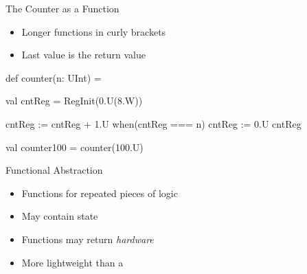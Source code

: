 \begin{frame}[fragile]{The Counter as a Function}
\begin{itemize}
\item Longer functions in curly brackets
\item Last value is the return value
\end{itemize}
\begin{chisel}
def counter(n: UInt) = {
  
  val cntReg = RegInit(0.U(8.W))
  
  cntReg := cntReg + 1.U
  when(cntReg === n) {
    cntReg := 0.U
  }
  cntReg
}

val counter100 = counter(100.U)
\end{chisel}
\end{frame}

\begin{frame}[fragile]{Functional Abstraction}
\begin{itemize}
\item Functions for repeated pieces of logic
\item May contain state
\item Functions may return \emph{hardware}
\item More lightweight than a 
\end{itemize}
\end{frame}


